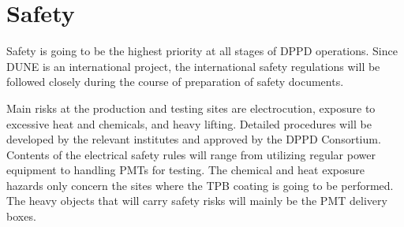 


\section{Safety}
\label{sec:fddp-pd-11}

Safety is going to be the highest priority at all stages of DPPD operations. Since DUNE is an international project, the international safety regulations will be followed closely during the course of preparation of safety documents.

Main risks at the production and testing sites are electrocution, exposure to excessive heat and chemicals, and heavy lifting. Detailed procedures will be developed by the relevant institutes and approved by the DPPD Consortium. Contents of the electrical safety rules will range from utilizing regular power equipment to handling PMTs for testing. The chemical and heat exposure hazards only concern the sites where the TPB coating is going to be performed. The heavy objects that will carry safety risks will mainly be the PMT delivery boxes.

